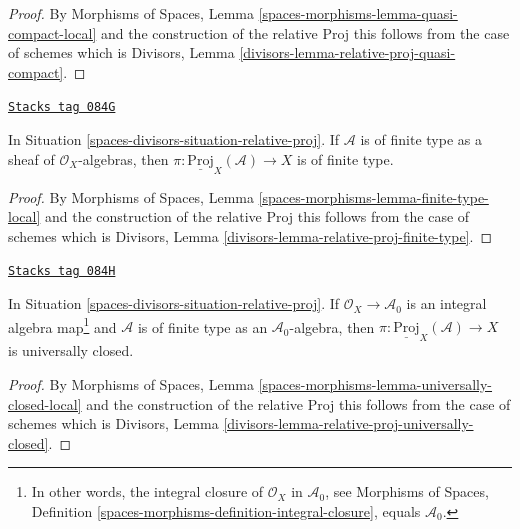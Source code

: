 \begin{proof}
By Morphisms of Spaces, Lemma \ref{spaces-morphisms-lemma-quasi-compact-local}
and the construction of the relative Proj this follows from the
case of schemes which is
Divisors, Lemma \ref{divisors-lemma-relative-proj-quasi-compact}.
\end{proof}

\begin{lemma}
\label{spaces-divisors-lemma-relative-proj-finite-type}
\href{https://stacks.math.columbia.edu/tag/084G}{\texttt{Stacks tag 084G}}

In Situation \ref{spaces-divisors-situation-relative-proj}.
If $\mathcal{A}$ is of finite type as a sheaf of
$\mathcal{O}_X$-algebras, then
$\pi : \underline{\text{Proj}}_X(\mathcal{A}) \to X$ is of finite type.
\end{lemma}

\begin{proof}
By Morphisms of Spaces, Lemma \ref{spaces-morphisms-lemma-finite-type-local}
and the construction of the relative Proj this follows from the
case of schemes which is
Divisors, Lemma \ref{divisors-lemma-relative-proj-finite-type}.
\end{proof}

\begin{lemma}
\label{spaces-divisors-lemma-relative-proj-universally-closed}
\href{https://stacks.math.columbia.edu/tag/084H}{\texttt{Stacks tag 084H}}

In Situation \ref{spaces-divisors-situation-relative-proj}. If
$\mathcal{O}_X \to \mathcal{A}_0$
is an integral algebra map\footnote{In other words, the integral
closure of $\mathcal{O}_X$ in $\mathcal{A}_0$, see
Morphisms of Spaces, Definition
\ref{spaces-morphisms-definition-integral-closure}, equals
$\mathcal{A}_0$.} and $\mathcal{A}$ is of finite type as an
$\mathcal{A}_0$-algebra, then
$\pi : \underline{\text{Proj}}_X(\mathcal{A}) \to X$ is universally closed.
\end{lemma}

\begin{proof}
By Morphisms of Spaces, Lemma
\ref{spaces-morphisms-lemma-universally-closed-local}
and the construction of the relative Proj this follows from the
case of schemes which is
Divisors, Lemma \ref{divisors-lemma-relative-proj-universally-closed}.
\end{proof}

